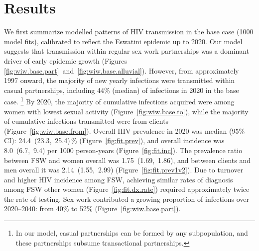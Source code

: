 \section{Results}\label{art.res}
We first summarize modelled patterns of HIV transmission in the base case (1000 model fits),
calibrated to reflect the Eswatini epidemic up to 2020.
Our model suggests that transmission within regular sex work partnerships
was a dominant driver of early epidemic growth
(Figures \ref{fig:wiw.base.part}~and~\ref{fig:wiw.base.alluvial}).
However, from approximately 1997 onward,
the majority of new yearly infections were transmitted within casual partnerships, %
including 44\% (median) of infections in 2020 in the base case.%
\footnote{In our model, casual partnerships can be formed by any subpopulation,
  and these partnerships subsume transactional partnerships.}
By 2020, the majority of cumulative infections acquired
were among women with lowest sexual activity (Figure~\ref{fig:wiw.base.to}),
while the majority of cumulative infections transmitted
were from clients (Figure~\ref{fig:wiw.base.from}).
Overall HIV prevalence in 2020 was median (95\% CI):
24.4~(23.3,~25.4)\,\% (Figure~\ref{fig:fit.prev}), %
and overall incidence was 8.0~(6.7,~9.4) per 1000 person-years (Figure~\ref{fig:fit.inc}).
The prevalence ratio between FSW and women overall was 1.75~(1.69,~1.86), %
and between clients and men overall it was 2.14~(1.55,~2.99) %
(Figure~\ref{fig:fit.prev1v2}).
Due to turnover and higher HIV incidence among FSW,
achieving similar rates of diagnosis among FSW \vs other women (Figure~\ref{fig:fit.dx.rate})
required approximately twice the rate of testing. %
Sex work contributed a growing proportion of infections
over 2020--2040: from 40\% to 52\% (Figure~\ref{fig:wiw.base.part}). %
